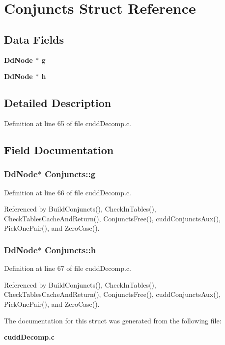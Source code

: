 \section{Conjuncts Struct Reference}
\label{structConjuncts}
\subsection*{Data Fields}
\begin{CompactItemize}
\item 
\bf{Dd\-Node} $\ast$ \bf{g}
\item 
\bf{Dd\-Node} $\ast$ \bf{h}
\end{CompactItemize}


\subsection{Detailed Description}




Definition at line 65 of file cudd\-Decomp.c.

\subsection{Field Documentation}
\subsubsection{\setlength{\rightskip}{0pt plus 5cm}\bf{Dd\-Node}$\ast$ \bf{Conjuncts::g}}\label{structConjuncts_3152421ce7b39465ea693f2abcd57ad3}




Definition at line 66 of file cudd\-Decomp.c.

Referenced by Build\-Conjuncts(), Check\-In\-Tables(), Check\-Tables\-Cache\-And\-Return(), Conjuncts\-Free(), cudd\-Conjuncts\-Aux(), Pick\-One\-Pair(), and Zero\-Case().
\subsubsection{\setlength{\rightskip}{0pt plus 5cm}\bf{Dd\-Node}$\ast$ \bf{Conjuncts::h}}\label{structConjuncts_ef9660cbc6a353c4eee6f53e26f46048}




Definition at line 67 of file cudd\-Decomp.c.

Referenced by Build\-Conjuncts(), Check\-In\-Tables(), Check\-Tables\-Cache\-And\-Return(), Conjuncts\-Free(), cudd\-Conjuncts\-Aux(), Pick\-One\-Pair(), and Zero\-Case().

The documentation for this struct was generated from the following file:\begin{CompactItemize}
\item 
\bf{cudd\-Decomp.c}\end{CompactItemize}
